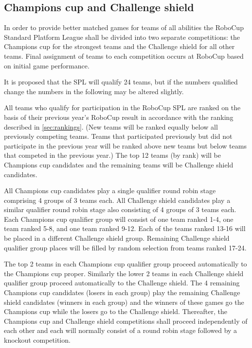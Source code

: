 \documentclass[12pt]{article}
\begin{document}
\subsection{Champions cup and Challenge shield}
\label{sec:twoCompetitions}
In order to provide better matched games for teams of all abilities the RoboCup Standard Platform League shall be divided into two separate competitions: the Champions cup for the strongest teams and the Challenge shield for all other teams. Final assignment of teams to each competition occurs at RoboCup based on initial game performance.

It is proposed that the SPL will qualify 24 teams, but if the numbers qualified change the numbers in the following may be altered slightly.

All teams who qualify for participation in the RoboCup SPL are ranked on the basis of their previous year's RoboCup result in accordance with the ranking described in \ref{sec:rankings}. (New teams will be ranked equally below all previously competing teams. Teams that participated previously but did not participate in the previous year will be ranked above new teams but below teams that competed in the previous year.) The top 12 teams (by rank) will be Champions cup candidates and the remaining teams will be Challenge shield candidates.

All Champions cup candidates play a single qualifier round robin stage comprising 4 groups of 3 teams each. All Challenge shield candidates play a similar qualifier round robin stage also consisting of 4 groups of 3 teams each. Each Champions cup qualifier group will consist of one team ranked 1-4, one team ranked 5-8, and one team ranked 9-12. Each of the teams ranked 13-16 will be placed in a different Challenge shield group. Remaining Challenge shield qualifier group places will be filled by random selection from teams ranked 17-24.

The top 2 teams in each Champions cup qualifier group proceed automatically to the Champions cup proper. Similarly the lower 2 teams in each Challenge shield qualifier group proceed automatically to the Challenge shield. The 4 remaining Champions cup candidates (losers in each group) play the remaining Challenge shield candidates (winners in each group) and the winners of these games go the Champions cup while the losers go to the Challenge shield. Thereafter, the Champions cup and Challenge shield competitions shall proceed independently of each other and each will normally consist of a round robin stage followed by a knockout competition.
\end{document}
